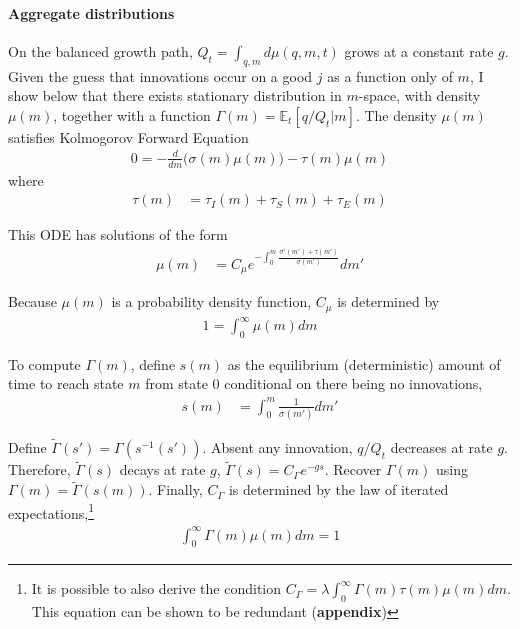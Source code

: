 \documentclass[12pt,english]{article}
\theoremstyle{remark}
\begin{document}
\paragraph{Aggregate distributions} 

On the balanced growth path, $Q_t = \int_{q,m} d\mu(q,m,t)$ grows at a constant rate $g$. Given the guess that innovations occur on a good $j$ as a function only of $m$, I show below that there exists stationary distribution in $m$-space, with density $\mu(m)$, together with a function $\Gamma(m) = \mathbb{E}_t[q/Q_t|m]$. The density $\mu(m)$ satisfies Kolmogorov Forward Equation
\begin{align}
0 = - \frac{d}{dm} \Big( \sigma(m) \mu(m) \Big) - \tau(m) \mu(m)  \label{KF_equation}
\end{align}
where
\begin{align}
\tau(m) &= \tau_I(m) + \tau_S(m) + \tau_E(m) 
\end{align}

This ODE has solutions of the form
\begin{align}
\mu(m) &= C_\mu e^{-\int_0^m \frac{\sigma'(m') + \tau(m')}{\sigma(m')}} dm' \label{KF_solution_1}
\end{align}

Because $\mu(m)$ is a probability density function, $C_\mu$ is determined by
\begin{align}
1 = \int_0^{\infty} \mu(m) dm \label{KF_solution_2}
\end{align}

To compute $\Gamma(m)$, define $s(m)$ as the equilibrium (deterministic) amount of time to reach state $m$ from state $0$ conditional on there being no innovations, 
\begin{align}
s(m) &= \int_0^m \frac{1}{\sigma(m')} dm'
\end{align}

Define $\tilde{\Gamma}(s') = \Gamma(s^{-1}(s'))$. Absent any innovation, $q/Q_t$ decreases at rate $g$. Therefore, $\tilde{\Gamma}(s)$ decays at rate $g$, $\tilde{\Gamma}(s) = C_{\Gamma} e^{-gs}$. Recover $\Gamma(m)$ using $\Gamma(m) = \tilde{\Gamma}(s(m))$. Finally, $C_{\Gamma}$ is determined by the law of iterated expectations,\footnote{It is possible to also derive the condition $C_{\Gamma} = \lambda \int_0^{\infty} \Gamma(m) \tau(m) \mu(m) dm$. This equation can be shown to be redundant (\textbf{appendix})}
\begin{align}
\int_0^{\infty} \Gamma(m) \mu(m) dm = 1
\end{align}
\end{document}
